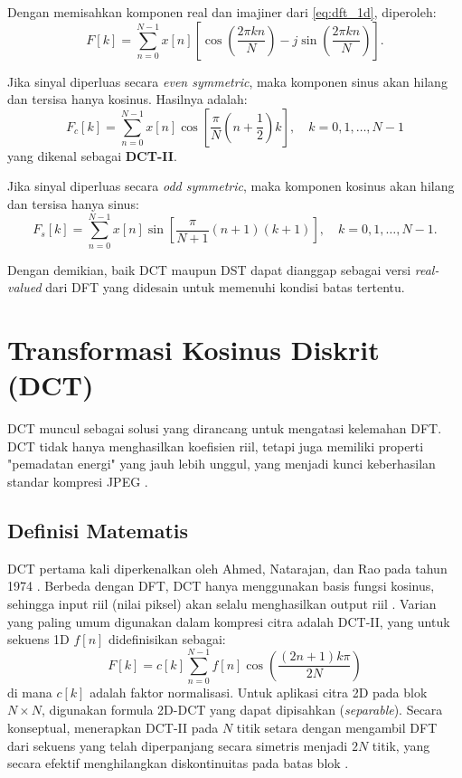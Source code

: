 \documentclass[a4paper]{article}
\begin{document}
Dengan memisahkan komponen real dan imajiner dari \eqref{eq:dft_1d}, diperoleh:
\begin{equation}
  F[k] = \sum_{n=0}^{N-1} x[n] \left[ \cos\left( \frac{2\pi kn}{N} \right) - j \sin\left( \frac{2\pi kn}{N} \right) \right].
\end{equation}

Jika sinyal diperluas secara \textit{even symmetric}, maka komponen sinus akan hilang dan tersisa hanya kosinus. Hasilnya adalah:
\begin{equation}
  F_c[k] = \sum_{n=0}^{N-1} x[n] \cos \left[ \frac{\pi}{N} \left( n + \frac{1}{2} \right) k \right],
  \quad k = 0, 1, \ldots, N-1
\end{equation}
yang dikenal sebagai \textbf{DCT-II}.

Jika sinyal diperluas secara \textit{odd symmetric}, maka komponen kosinus akan hilang dan tersisa hanya sinus:
\begin{equation}
  F_s[k] = \sum_{n=0}^{N-1} x[n] \sin \left[ \frac{\pi}{N+1} (n + 1)(k + 1) \right],
  \quad k = 0, 1, \ldots, N-1.
\end{equation}

Dengan demikian, baik DCT maupun DST dapat dianggap sebagai versi \textit{real-valued} dari DFT yang didesain untuk memenuhi kondisi batas tertentu.


\section{Transformasi Kosinus Diskrit (DCT)}
DCT muncul sebagai solusi yang dirancang untuk mengatasi kelemahan DFT. DCT tidak hanya menghasilkan koefisien riil, tetapi juga memiliki properti "pemadatan energi" yang jauh lebih unggul, yang menjadi kunci keberhasilan standar kompresi JPEG \cite{wallace1991jpeg}.

\subsection{Definisi Matematis}
DCT pertama kali diperkenalkan oleh Ahmed, Natarajan, dan Rao pada tahun 1974 \cite{ahmed1974dct}. Berbeda dengan DFT, DCT hanya menggunakan basis fungsi kosinus, sehingga input riil (nilai piksel) akan selalu menghasilkan output riil \cite{ucsd_dct_notes}. Varian yang paling umum digunakan dalam kompresi citra adalah DCT-II, yang untuk sekuens 1D $f[n]$ didefinisikan sebagai:
\begin{equation} \label{eq:dct_1d}
  F[k] = c[k] \sum_{n=0}^{N-1} f[n] \cos\left(\frac{(2n+1)k\pi}{2N}\right)
\end{equation}
di mana $c[k]$ adalah faktor normalisasi. Untuk aplikasi citra 2D pada blok $N \times N$, digunakan formula 2D-DCT yang dapat dipisahkan (\textit{separable}). Secara konseptual, menerapkan DCT-II pada $N$ titik setara dengan mengambil DFT dari sekuens yang telah diperpanjang secara simetris menjadi $2N$ titik, yang secara efektif menghilangkan diskontinuitas pada batas blok \cite{ucsd_dct_notes}.
\end{document}
